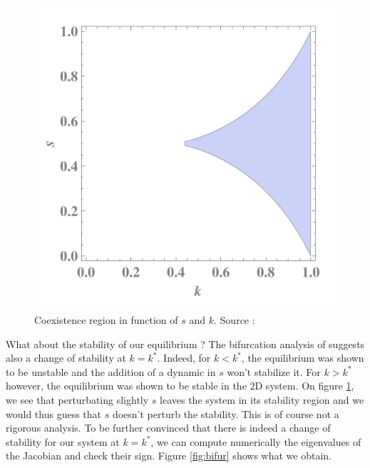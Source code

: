 \documentclass{article}
\begin{document}
\begin{figure}[H]
\centering
\includegraphics[scale=0.5]{coexistence.png}
\caption{Coexistence region in function of $s$ and $k$. Source : \cite{bilingual}}
\label{fig:coexistence}
\end{figure}

What about the stability of our equilibrium ?
The bifurcation analysis of \cite{bilingual} suggests also a change of stability at $k=k^{\ast}$.
Indeed, for $k<k^{\ast}$, the equilibrium was shown to be unstable and the addition of a dynamic in $s$ won't stabilize it.
For $k>k^{\ast}$ however, the equilibrium was shown to be stable in the 2D system.
On figure \ref{fig:coexistence}, we see that perturbating slightly $s$ leaves the system in its stability region and we would thus guess that $s$ doesn't perturb the stability.
This is of course not a rigorous analysis.
To be further convinced that there is indeed a change of stability for our system at $k=k^{\ast}$, we can compute numerically the eigenvalues of the Jacobian and check their sign.
Figure \ref{fig:bifur} shows what we obtain.
\end{document}

